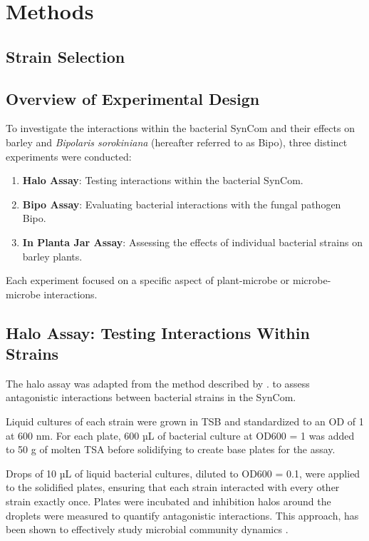 \section{Methods}

\subsection{Strain Selection}



\subsection{Overview of Experimental Design}
To investigate the interactions within the bacterial \ac{SynCom} and their effects on barley and \textit{Bipolaris sorokiniana} (hereafter referred to as Bipo), three distinct experiments were conducted:
\begin{enumerate}
    \item \textbf{Halo Assay}: Testing interactions within the bacterial \ac{SynCom}.
    \item \textbf{Bipo Assay}: Evaluating bacterial interactions with the fungal pathogen \linebreak \ac{Bipo}.
    \item \textbf{In Planta Jar Assay}: Assessing the effects of individual bacterial strains on barley plants.
\end{enumerate}
Each experiment focused on a specific aspect of plant-microbe or microbe-microbe interactions.


\subsection{Halo Assay: Testing Interactions Within Strains}
The halo assay was adapted from the method described by \citet{getzke2023Cofunctioning}. to assess antagonistic interactions between bacterial strains in the \ac{SynCom}.

Liquid cultures of each strain were grown in \ac{TSB} and standardized to an \ac{OD} of 1 at 600 nm. For each plate, 600 µL of bacterial culture at OD600 = 1 was added to 50 g of molten \ac{TSA} before solidifying to create base plates for the assay.

Drops of 10 µL of liquid bacterial cultures, diluted to OD600 = 0.1, were applied to the solidified plates, ensuring that each strain interacted with every other strain exactly once. Plates were incubated and inhibition halos around the droplets were measured to quantify antagonistic interactions. This approach,  has been shown to effectively study microbial community dynamics \cite{getzke2023Cofunctioning}.

